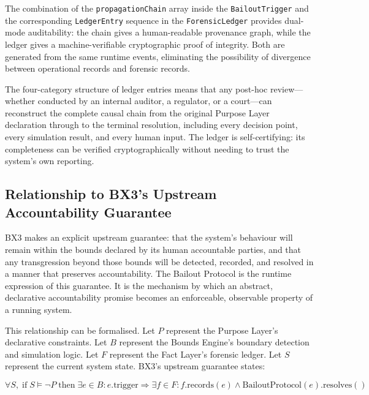 The combination of the \texttt{propagationChain} array inside the \texttt{BailoutTrigger} and the corresponding \texttt{LedgerEntry} sequence in the \texttt{ForensicLedger} provides dual-mode auditability: the chain gives a human-readable provenance graph, while the ledger gives a machine-verifiable cryptographic proof of integrity. Both are generated from the same runtime events, eliminating the possibility of divergence between operational records and forensic records.

The four-category structure of ledger entries means that any post-hoc review---whether conducted by an internal auditor, a regulator, or a court---can reconstruct the complete causal chain from the original Purpose Layer declaration through to the terminal resolution, including every decision point, every simulation result, and every human input. The ledger is self-certifying: its completeness can be verified cryptographically without needing to trust the system's own reporting.

\subsection{Relationship to BX3's Upstream Accountability Guarantee}
\label{sec:upstream-guarantee}

BX3 makes an explicit upstream guarantee: that the system's behaviour will remain within the bounds declared by its human accountable parties, and that any transgression beyond those bounds will be detected, recorded, and resolved in a manner that preserves accountability. The Bailout Protocol is the runtime expression of this guarantee. It is the mechanism by which an abstract, declarative accountability promise becomes an enforceable, observable property of a running system.

This relationship can be formalised. Let $P$ represent the Purpose Layer's declarative constraints. Let $B$ represent the Bounds Engine's boundary detection and simulation logic. Let $F$ represent the Fact Layer's forensic ledger. Let $S$ represent the current system state. BX3's upstream guarantee states:

\begin{equation}
    \forall S, \; \text{if} \; S \models \neg P \; \text{then} \;
    \exists e \in B : e.\text{trigger} \Rightarrow
    \exists f \in F : f.\text{records}(e) \land \text{BailoutProtocol}(e).\text{resolves}()
\end{equation}

